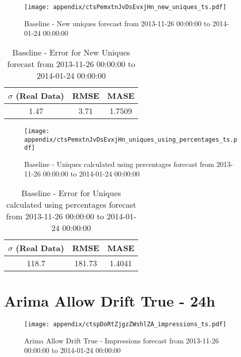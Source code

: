\begin{figure}[H] \begin{center} \leavevmode
\texttt{[image: appendix/ctsPemxtnJvDsEvxjHn\_new\_uniques\_ts.pdf]} \caption{
Baseline - New uniques forecast from 2013-11-26 00:00:00 to 2014-01-24 00:00:00} \label{fig:appendix/ctsPemxtnJvDsEvxjHn_new_uniques_ts.pdf} \end{center}
\end{figure}

\begin{table}[H]
\centering
\footnotesize
\begin{tabular}{ccc}
$\sigma$ (Real Data) & RMSE & MASE   \\ \hline
1.47 & 3.71 & 1.7509 \\
\end{tabular}

\vspace{0.5cm}

\caption{
Baseline - Error for New Uniques forecast from 2013-11-26 00:00:00 to 2014-01-24 00:00:00}
\end{table}

\begin{figure}[H] \begin{center} \leavevmode
\texttt{[image: appendix/ctsPemxtnJvDsEvxjHn\_uniques\_using\_percentages\_ts.pdf]} \caption{
Baseline - Uniques calculated using percentages forecast from 2013-11-26 00:00:00 to 2014-01-24 00:00:00} \label{fig:appendix/ctsPemxtnJvDsEvxjHn_uniques_using_percentages_ts.pdf} \end{center}
\end{figure}

\begin{table}[H]
\centering
\footnotesize
\begin{tabular}{ccc}
$\sigma$ (Real Data) & RMSE & MASE   \\ \hline
118.7 & 181.73 & 1.4041 \\
\end{tabular}

\vspace{0.5cm}

\caption{
Baseline - Error for Uniques calculated using percentages forecast from 2013-11-26 00:00:00 to 2014-01-24 00:00:00}
\end{table}

\section{Arima Allow Drift True - 24h}
\begin{figure}[H] \begin{center} \leavevmode
\texttt{[image: appendix/ctspDoRtZjgzZWshlZA\_impressions\_ts.pdf]} \caption{
Arima Allow Drift True - Impressions forecast from 2013-11-26 00:00:00 to 2014-01-24 00:00:00} \label{fig:appendix/ctspDoRtZjgzZWshlZA_impressions_ts.pdf} \end{center}
\end{figure}

